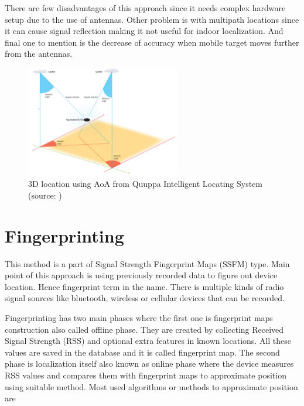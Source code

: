There are few disadvantages of this approach since it needs complex hardware setup due to the use of antennas. Other problem is with multipath locations since it can cause signal reflection making it not useful for indoor localization. And final one to mention is the decrease of accuracy when mobile target moves further from the antennas.\cite{AoA}\cite{RofAoA}

\begin{figure}[h!]
	\begin{centering}
		\includegraphics[width=0.6\textwidth]{img/angulation}
		\par\end{centering}
	\caption{3D location using AoA from Quuppa Intelligent Locating System (source: \cite{QAoA})\label{fig:AoAQuuppa}}
	\label{fig4}
\end{figure}

\section{Fingerprinting}\label{sec:Fingerprinting}
This method is a part of Signal Strength Fingerprint Maps (SSFM) type. Main point of this approach is using previously recorded data to figure out device location. Hence fingerprint term in the name. There is multiple kinds of radio signal sources like bluetooth, wireless or cellular devices that can be recorded.

Fingerprinting has two main phases where the first one is fingerprint maps construction also called offline phase. They are created by collecting Received Signal Strength (RSS) and optional extra features in known locations. All these values are saved in the database and it is called fingerprint map. The second phase is localization itself also known as online phase where the device measures RSS values and compares them with fingerprint maps to approximate position using suitable method. \cite{LocalizationApproaches}\cite{ILWTP} Most used algorithms or methods to approximate position are \cite{IILUBLEB}


